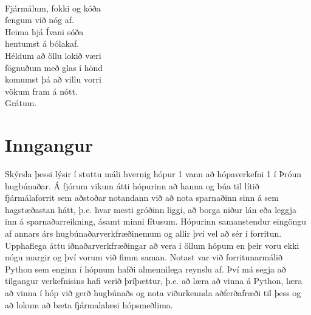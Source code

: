 \documentclass[a4paper,10pt]{article}
\begin{document}

\pagebreak
\begin{center}


\hspace{0.3cm}\\
\noindent Fjármálum, fokki og kóða\\ 
fengum við nóg af.		\\
Heima hjá Ívani sóða	 \\
hentumst á bólakaf.	\\
Héldum að öllu lokið væri\\
fögnuðum með glas í hönd\\
komumst þá að villu vorri\\
vökum fram á nótt.\\	
Grátum.
\end{center}
\pagebreak
\onehalfspacing
\section{Inngangur}
Skýrsla þessi lýsir í stuttu máli hvernig hópur 1 vann að hópaverkefni 1 í Þróun hugbúnaðar.  Á fjórum vikum átti hópurinn að hanna og búa til lítið fjármálaforrit sem aðstoðar notandann við að nota sparnaðinn sinn á sem hagstæðastan hátt, þ.e. hvar mesti gróðinn liggi, að borga niður lán eða leggja inn á sparnaðarreikning, ásamt minni fítusum.  Hópurinn samanstendur eingöngu af annars árs hugbúnaðarverkfræðinemum og allir því vel að sér í forritun.  Upphaflega áttu iðnaðarverkfræðingar að vera í öllum hópum en þeir voru ekki nógu margir og því vorum við fimm saman. Notast var við forritunarmálið Python sem enginn í hópnum hafði almennilega reynslu af.  Því má segja að tilgangur verkefnisins hafi verið þríþættur, þ.e. að læra að vinna á Python, læra að vinna í hóp við gerð hugbúnaðs og nota viðurkennda aðferðafræði til þess og að lokum að bæta fjármalalæsi hópsmeðlima.
\end{document}
